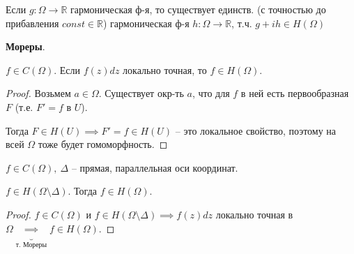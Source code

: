 \begin{remark}
    Если $g: \Omega \rightarrow \mathbb{R}$ гармоническая ф-я, то существует единств. (с точностью до прибавления $const \in \mathbb{R}$) гармоническая ф-я $h: \Omega \rightarrow \mathbb{R}$, т.ч. $g + i h \in H(\Omega)$
\end{remark}

\begin{theorem}
    \textbf{Мореры}.

    $f \in C(\Omega)$. Если $f(z) dz$ локально точная, то $f \in H(\Omega)$.
\end{theorem}
\begin{proof}
    Возьмем $a \in \Omega$. Существует окр-ть $a$, что для $f$ в ней есть первообразная $F$ (т.е. $F' = f$ в $U$).

    Тогда $F \in H(U) \implies F' = f \in H(U)$ -- это локальное свойство, поэтому на всей $\Omega$ тоже будет гомоморфность.
\end{proof}

\begin{consequence}
    $f \in C(\Omega), \ \Delta$ -- прямая, параллельная оси координат.

    $f \in H(\Omega \setminus \Delta)$. Тогда $f \in H(\Omega)$.
\end{consequence}
\begin{proof}
    $f \in C(\Omega)$ и $f \in H(\Omega \setminus \Delta) \implies f(z) dz$ локально точная в $\Omega \underbrace{\implies}_{\text{т. Мореры}} f \in H(\Omega)$.
\end{proof}

